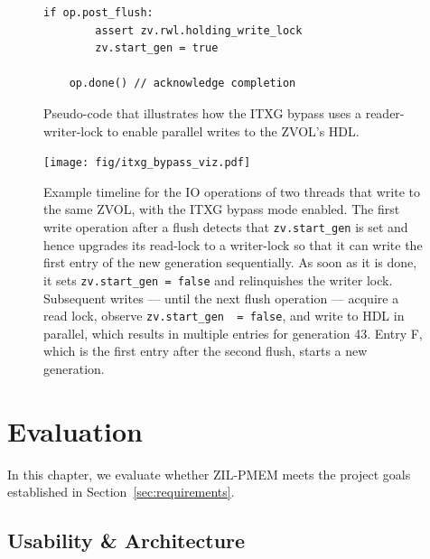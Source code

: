 \documentclass[12pt,a4paper,twoside]{book}
\begin{document}
{\begin{figure}[H]
\begin{lstlisting}[style=figurepseudocode]
    if op.post_flush:
        assert zv.rwl.holding_write_lock
        zv.start_gen = true

    op.done() // acknowledge completion
\end{lstlisting}
\caption{Pseudo-code that illustrates how the ITXG bypass uses a reader-writer-lock to enable parallel writes to the ZVOL's HDL.}
\label{fig:itxg_bypass_zvol:pseudocode:modified}
\end{figure}

\begin{figure}[H]
    \centering
    \texttt{[image: fig/itxg\_bypass\_viz.pdf]}
    \caption{Example timeline for the IO operations of two threads that write to the same ZVOL, with the ITXG bypass mode enabled.
        The first write operation after a flush detects that \lstinline{zv.start_gen} is set and hence upgrades its read-lock to a writer-lock so that it can write the first entry of the new generation sequentially.
        As soon as it is done, it sets \lstinline{zv.start_gen = false} and relinquishes the writer lock.
        Subsequent writes --- until the next flush operation --- acquire a read lock, observe \lstinline{zv.start_gen  = false}, and write to HDL in parallel, which results in multiple entries for generation 43.
        Entry F, which is the first entry after the second flush, starts a new generation.
    }
    \label{fig:itxg_bypass_viz}
\end{figure}


\chapter{Evaluation}\label{ch:eval}
In this chapter, we evaluate whether ZIL-PMEM meets the project goals established in Section~\ref{sec:requirements}.

\section{Usability \& Architecture}

}
\end{document}
